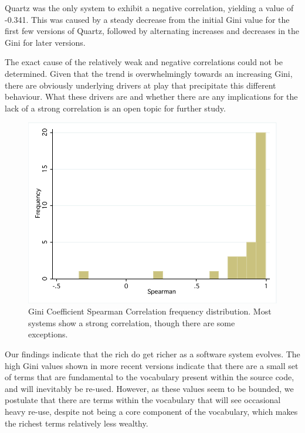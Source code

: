 Quartz was the only system to exhibit a negative correlation, yielding a value of -0.341. This was caused by a steady decrease from the initial Gini value for the first few versions of Quartz, followed by alternating increases and decreases in the Gini for later versions.

The exact cause of the relatively weak and negative correlations could not be determined. Given that the trend is overwhelmingly towards an increasing Gini, there are obviously underlying drivers at play that precipitate this different behaviour. What these drivers are and whether there are any implications for the lack of a strong correlation is an open topic for further study.

\begin{figure}[t]
\centering
\includegraphics[width=\textwidth]{Figures/Vocab-GiniSpearmanFreqDist.pdf}
\caption{Gini Coefficient Spearman Correlation frequency distribution. Most systems show a strong correlation, though there are some exceptions.}
\label{fig:vocab-gini-spearman}
\end{figure}

Our findings indicate that the rich do get richer as a software system evolves. The high Gini values shown in more recent versions indicate that there are a small set of terms that are fundamental to the vocabulary present within the source code, and will inevitably be re-used. However, as these values seem to be bounded, we postulate that there are terms within the vocabulary that will see occasional heavy re-use, despite not being a core component of the vocabulary, which makes the richest terms relatively less wealthy.

